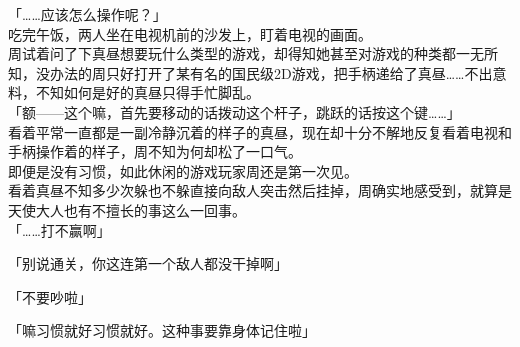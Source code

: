 

「……应该怎么操作呢？」\\

吃完午饭，两人坐在电视机前的沙发上，盯着电视的画面。\\

周试着问了下真昼想要玩什么类型的游戏，却得知她甚至对游戏的种类都一无所知，没办法的周只好打开了某有名的国民级2D游戏，把手柄递给了真昼……不出意料，不知如何是好的真昼只得手忙脚乱。\\

「额——这个嘛，首先要移动的话拨动这个杆子，跳跃的话按这个键……」\\

看着平常一直都是一副冷静沉着的样子的真昼，现在却十分不解地反复看着电视和手柄操作着的样子，周不知为何却松了一口气。\\

即便是没有习惯，如此休闲的游戏玩家周还是第一次见。\\

看着真昼不知多少次躲也不躲直接向敌人突击然后挂掉，周确实地感受到，就算是天使大人也有不擅长的事这么一回事。\\

「……打不赢啊」

「别说通关，你这连第一个敌人都没干掉啊」

「不要吵啦」

「嘛习惯就好习惯就好。这种事要靠身体记住啦」\\

